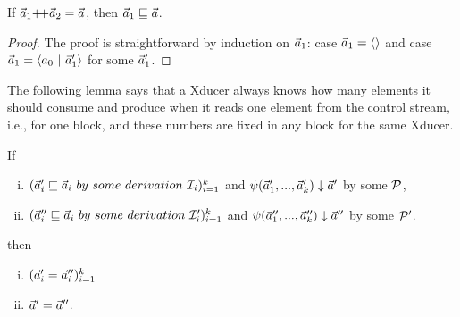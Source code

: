 \begin{lem}\label{lem-app2pre}
	If $\a_1 {\++} \a_2 = \a$, then $\vec a_1 \sqsubseteq \vec a$.
\end{lem}
\begin{proof}
	The proof is straightforward by induction on $\vec a_1$: case $\vec a_1 = \langle \rangle$ and case $ \a_1 = \< a_0 \ | \ \a_1' \'>$ for some $\vec a_1'$.
\end{proof}

The following lemma says that a Xducer always knows how many elements it should consume and produce when it reads one element from the control stream, i.e., for one block, and these numbers are fixed in any block for the same Xducer.


\begin{lem} \label{lem-block-unique}
	If
	\begin{enumerate}[(i)]
		\item $(\a_i' \prefix  \a_i \ by \ some \ derivation \ \MI_{i})^k_{i=1}$ and ${\psi}(\vec a_1',...,\vec a_k') \downarrow \vec a'$ by some $\mathcal{P}$, 
		\item $(\a_i'' \prefix \a_i \ by \ some \ derivation \ \MI'_{i})^k_{i=1}$ and
		${\psi}(\vec a_1'',...,\vec a_k'') \downarrow \vec a''$ by some $\mathcal{P}'$.
	\end{enumerate} 
	then \begin{enumerate}[(i)]
		\item $(\vec a_i' = \vec a_i'')^k_{i=1}$ 
		\item $\vec a' = \vec a''$.
	\end{enumerate}
\end{lem}

